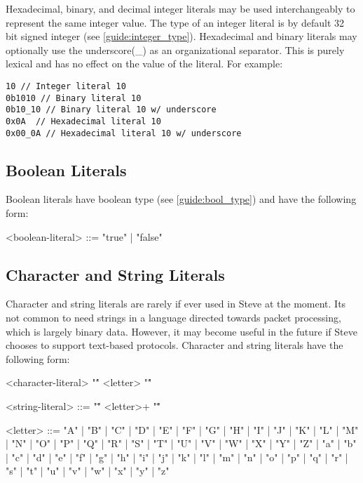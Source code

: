 Hexadecimal, binary, and decimal integer literals may be used interchangeably to represent the same integer value. The type of an integer literal is by default 32 bit signed integer (see \ref{guide:integer_type}). Hexadecimal and binary literals may optionally use the underscore(\_) as an organizational separator. This is purely lexical and has no effect on the value of the literal. For example:

\begin{minip}
\begin{lstlisting}
10 // Integer literal 10
0b1010 // Binary literal 10
0b10_10 // Binary literal 10 w/ underscore
0x0A  // Hexadecimal literal 10
0x00_0A // Hexadecimal literal 10 w/ underscore  
\end{lstlisting}
\end{minip}

\subsection{Boolean Literals}

Boolean literals have boolean type (see \ref{guide:bool_type}) and have the following form:

\begin{minip}
\begin{grammar}
<boolean-literal> ::= "true" | "false"
\end{grammar}
\end{minip}

\subsection{Character and String Literals}

Character and string literals are rarely if ever used in Steve at the moment. Its not common to need strings in a language directed towards packet processing, which is largely binary data. However, it may become useful in the future if Steve chooses to support text-based protocols.  Character and string literals have the following form:

\begin{minip}
\begin{grammar}
<character-literal> "\'" <letter> "\'"

<string-literal> ::= "\"" <letter>+ "\""

<letter> ::= "A" | "B" | "C" | "D" | "E" | "F" | "G"
       | "H" | "I" | "J" | "K" | "L" | "M" | "N"
       | "O" | "P" | "Q" | "R" | "S" | "T" | "U"
       | "V" | "W" | "X" | "Y" | "Z" | "a" | "b"
       | "c" | "d" | "e" | "f" | "g" | "h" | "i"
       | "j" | "k" | "l" | "m" | "n" | "o" | "p"
       | "q" | "r" | "s" | "t" | "u" | "v" | "w"
       | "x" | "y" | "z"
\end{grammar}
\end{minip}

